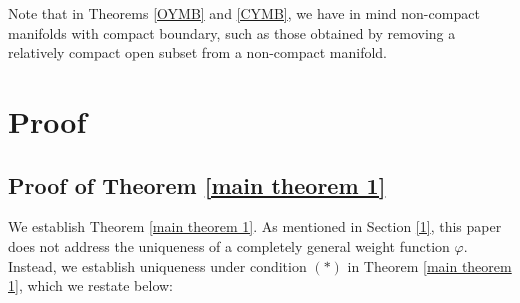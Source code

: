 \documentclass[12pt]{article}
\theoremstyle{definition}
\begin{document}
Note that in Theorems \ref{OYMB} and \ref{CYMB}, we have in mind non-compact manifolds with compact boundary, such as those obtained by removing a relatively compact open subset from a non-compact manifold.



\section{Proof}\label{4}
\subsection{Proof of Theorem \ref{main theorem 1}}
We establish Theorem \ref{main theorem 1}. As mentioned in Section \ref{1}, this paper does not address the uniqueness of a completely general weight function $\varphi$. Instead, we establish uniqueness under condition $(\ast)$ in Theorem \ref{main theorem 1}, which we restate below:
\end{document}
